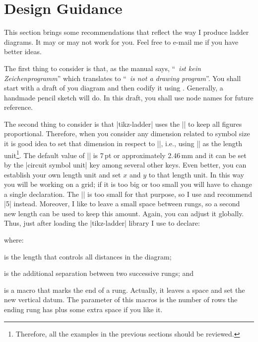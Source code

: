\documentclass[a4paper]{ltxdoc}
\newlength{\ladderskip}
\newlength{\ladderrungsep}
\def\ladderrungend#1{\pgftransformyshift{-#1\ladderskip-\ladderrungsep}}
\begin{document}
\section{Design Guidance\label{guidance}}
This section brings some recommendations that reflect the way I produce ladder diagrams. It may or may not work for you. Feel free to e-mail me if you have better ideas.

The first thing to consider is that, as the manual says, ``\tikzname\ \emph{ist kein Zeichenprogramm}'' which translates to ``\tikzname\ \emph{is not a drawing program}''. You shall start with a draft of you diagram and then codify it using \tikzname. Generally, a handmade pencil sketch will do. In this draft, you shall use node names for future reference.

The second thing to consider is that |tikz-ladder| uses the |\tikzcircuitssizeunit| to keep all figures proportional. Therefore, when you consider any dimension related to symbol size it is good idea to set that dimension in respect to |\tikzcircuitssizeunit|, i.e., using |\tikzcircuitssizeunit| as the length unit\footnote{Therefore, all the examples in the previous sections should be reviewed.}. The default value of |\tikzcircuitssizeunit| is 7\,pt or approximately 2.46\,mm and it can be set by the |circuit symbol unit| key among several other keys. Even better, you can establish your own length unit and set $x$ and $y$ to that length unit. In this way you will be working on a grid; if it is too big or too small you will have to change a single declaration. The |\tikzcircuitssizeunit| is too small for that purpose, so I use and recommend |5\tikzcircuitssizeunit| instead. Moreover, I like to leave a small space between rungs, so a second new length can be used to keep this amount. Again, you can adjust it globally. Thus, just after loading the |tikz-ladder| library I use to declare:
\begin{codeexample}
\newlength{\ladderskip}
\setlength{\ladderskip}{5\tikzcircuitssizeunit} %
\newlength{\ladderrungsep}
\setlength{\ladderrungsep}{.2\ladderskip}
\def\ladderrungend#1{\pgftransformyshift{-#1\ladderskip-\ladderrungsep}}
\end{codeexample}
\noindent{}where:
\begin{description}[align=right,leftmargin=3.2cm,labelwidth=3cm,labelsep=2mm]
\item[|ladderskip|] is the length that controls all distances in the diagram;
\item[|ladderrungsep|] is the additional separation between two successive rungs; and
\item[|ladderrungend|] is a macro that marks the end of a rung. Actually, it leaves a space and set the new vertical datum. The parameter of this macros is the number of rows the ending rung has plus some extra space if you like it.
\end{description}
\end{document}
